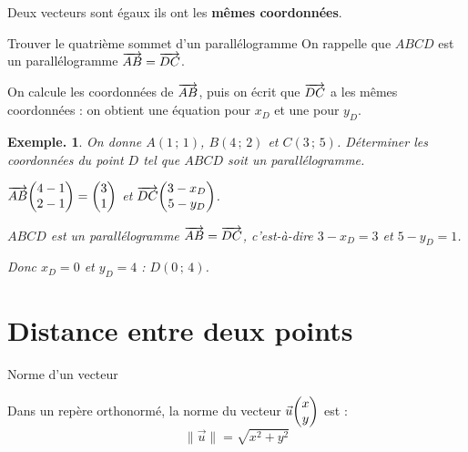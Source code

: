 \documentclass[12pt]{article}
\theoremstyle{break}
\newtheorem*{example}{Exemple.}
\begin{document}
\begin{proposition}{}{}
  \begin{multihide}
    Deux vecteurs sont égaux \ssi ils ont les \textbf{mêmes coordonnées}.
  \end{multihide}
\end{proposition}

\begin{method}{Trouver le quatrième sommet d'un parallélogramme}{}
  On rappelle que $ABCD$ est un parallélogramme \ssi $\overrightarrow{AB} = \overrightarrow{DC}$.

  On calcule les coordonnées de $\overrightarrow{AB}$, puis on écrit que $\overrightarrow{DC}$ a les mêmes coordonnées : on obtient une équation pour $x_D$ et une pour $y_D$.
\end{method}

\begin{example}
  On donne $A(1\,;\,1)$, $B(4\,;\,2)$ et $C(3\,;\,5)$. Déterminer les coordonnées du point $D$ tel que $ABCD$ soit un parallélogramme.
  \begin{reponse}
    $\wvec{AB}\col{4-1}{2-1} = \col{3}{1}$ et $\wvec{DC}\col{3 - x_D}{5 - y_D}$.

    $ABCD$ est un parallélogramme \ssi $\overrightarrow{AB} = \overrightarrow{DC}$, c'est-à-dire $3 - x_D = 3$ et $5 - y_D = 1$.

    Donc $x_D = 0$ et $y_D = 4$ : $D(0\,;\,4)$.
  \end{reponse}
\end{example}

\newpage
\section{Distance entre deux points}

\begin{proposition}{Norme d'un vecteur}{}
  \begin{multihide}
    Dans un repère orthonormé, la norme du vecteur $\vec u\col{x}{y}$ est :
    \[
      \lVert \vec u \rVert = \sqrt{x^2 + y^2}
    \]
  \end{multihide}
\end{proposition}
\end{document}
